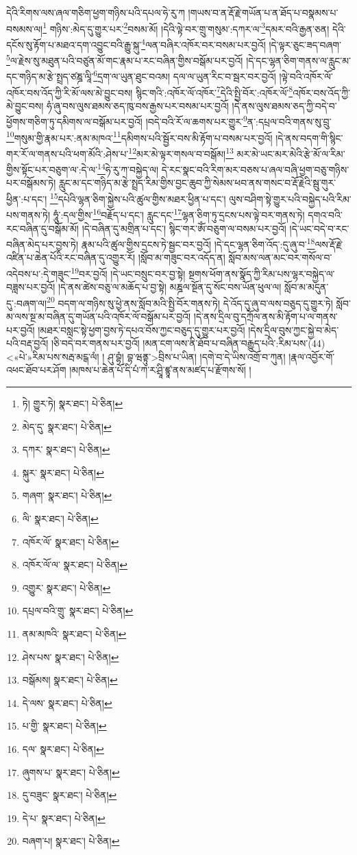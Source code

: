 དེའི་རིགས་ལས་ཞལ་གཅིག་ཕྱག་གཉིས་པའི་དཔལ་ཧེ་རུ་ཀ །གཡས་བ་ན་རྡོ་རྗེ་གཡོན་པ་ན་ཐོད་པ་བསྣམས་པ་བསམས་ལ།\footnote{ཏེ། གྱུར་ཏེ།  སྣར་ཐང་།  པེ་ཅིན། } གཉིས་:མེད་དུ་གྱུར་པར་\footnote{མེད་དུ་  སྣར་ཐང་།  པེ་ཅིན། }བསམ་མོ། །དེའི་ལྟེ་བར་གྲུ་གསུམ་:དཀར་ལ་\footnote{དཀར་  སྣར་ཐང་།  པེ་ཅིན། }དམར་བའི་རྒྱན་ཅན། དེའི་དངོས་སུ་རྟོག་པ་མཐའ་དག་འབྱུང་བའི་རྒྱུ་སྐུ་\footnote{སྐུར་  སྣར་ཐང་།  པེ་ཅིན། }ལན་བཞིར་འཁོར་བར་བསམ་པར་བྱའོ། །དེ་ལྟར་ཅུང་ཟད་བཞག་\footnote{གཞག་  སྣར་ཐང་།  པེ་ཅིན། }ལ་རྗེས་སུ་མཐུན་པའི་བཙུན་མོ་གང་རྣམ་པ་རང་བཞིན་གྱིས་བསྒོམ་པར་བྱའོ། །དེ་དང་ལྷན་ཅིག་གནས་ལ་རླུང་མ་དང་གཉིད་མ་རྩེ་སྤྲད་ཙཎྜ་ལཱི་\footnote{ལི་  སྣར་ཐང་།  པེ་ཅིན། }དྲག་ལ་ཡུན་ཐུང་བའམ། དལ་ལ་ཡུན་རིང་བ་སྦར་བར་བྱའོ། །ལྟེ་བའི་འཁོར་ལོ་འཁོར་བས་འོད་ཀྱི་རི་མོ་ལས་མེ་བྱུང་བས། སྙིང་གའི་:འཁོར་ལོ་འཁོར་\footnote{འཁོར་ལོ་  སྣར་ཐང་།  པེ་ཅིན། }དེའི་སྤྱི་བོར་:འཁོར་ལོ་\footnote{འཁོར་ལོ་ལ་  སྣར་ཐང་།  པེ་ཅིན། }འཁོར་བས་འོད་ཀྱི་མེ་བྱུང་བས། ཧཾ་ཞུ་བས་ལུས་ཐམས་ཅད་ཁུ་བས་རྒྱས་པར་བསམ་པར་བྱའོ། །དེ་ནས་ལུས་ཐམས་ཅད་ཀྱི་བདེ་བ་ཕྱོགས་གཅིག་ཏུ་དམིགས་ལ་བསྒོམ་པར་བྱའོ། །བདེ་བའི་རོ་ལ་ཆགས་པར་གྱུར་\footnote{འགྱུར་  སྣར་ཐང་།  པེ་ཅིན། }ན་:དཔྲལ་བའི་གནས་སུ་བྲུ་\footnote{དཔྲལ་བའི་གྲུ་  སྣར་ཐང་།  པེ་ཅིན། }གསུམ་གྱི་རྣམ་པར་:ནམ་མཁའ་\footnote{ནམ་མཁའི་  སྣར་ཐང་།  པེ་ཅིན། }དམིགས་པའི་སྦྱོར་བས་མི་རྟོག་པ་བསམ་པར་བྱའོ། །དེ་ནས་བདག་གི་སྙིང་གར་རོ་ལ་གནས་པའི་ཕག་མོའི་:ཤེས་པ་\footnote{ཤེས་པས་  སྣར་ཐང་།  པེ་ཅིན། }མར་མེ་ལྟར་གསལ་བ་བསྒོམ།\footnote{བསྒོམས།  སྣར་ཐང་།  པེ་ཅིན། } མར་མེ་ཡང་མར་མེའི་རྩེ་མོ་ལ་རིམ་གྱིས་སྟོང་པར་བཅུག་ལ་:དེ་ལ་\footnote{དེ་ལས་  སྣར་ཐང་།  པེ་ཅིན། }ཧེ་རུ་ཀ་བསྐྱེད་ལ། དེ་རང་སྣང་བའི་རིག་མར་བཅས་པ་ཞལ་བཞི་ཕྱག་བཅུ་གཉིས་པར་བསྒོམས་ཏེ། རླུང་མ་དང་གཉིད་མ་རྩེ་སྤྲད་རིམ་གྱིས་བྱང་ཆུབ་ཀྱི་སེམས་ཕབ་ནས་གསང་བ་རྡོ་རྗེའི་སྦུ་གུར་ཕྱིན་:པ་དང་། \footnote{པ་གྱི་  སྣར་ཐང་།  པེ་ཅིན། }དཔེའི་ལྷན་ཅིག་སྐྱེས་པའི་ཚུལ་གྱིས་མཐར་ཕྱིན་པ་དང་། ལུས་བཤིག་སྟེ་གྱུར་པའི་བསྐྱེད་པའི་རིམ་པས་གནས་ཏེ། ཧཱུཾ་:དལ་གྱིས་\footnote{དལ་  སྣར་ཐང་།  པེ་ཅིན། }བརྗོད་པ་དང་། རླུང་དང་\footnote{ཞུགས་པ་  སྣར་ཐང་།  པེ་ཅིན། }ལྷན་ཅིག་ཏུ་དྲངས་པས་ལྟེ་བར་གནས་ཏེ། དགའ་བའི་རང་བཞིན་དུ་བསྒོམ་མོ། །དེ་བཞིན་དུ་མགྲིན་པ་དང་། སྙིང་གར་ཨོཾ་བཅུག་ལ་བསམ་པར་བྱའོ། །དེ་ཡང་བདེ་བ་རང་བཞིན་མེད་པར་བྱས་ཏེ། རྣམ་པའི་ཚུལ་གྱིས་དྲངས་ཏེ་སྦྱང་བར་བྱའོ། །དེ་དང་ལྷན་ཅིག་འོད་:དུ་ཞུ་བ་\footnote{དུ་བཟུང་  སྣར་ཐང་།  པེ་ཅིན། }ལས་རྡོ་རྗེ་འཛིན་པ་ཆེན་པོའི་རང་བཞིན་དུ་འགྱུར་རོ། །སློབ་མ་གཟུང་བར་འདོད་ན། སློབ་མས་ལན་མང་བར་གསོལ་བ་འདེབས་པ་:དེ་གཟུང་\footnote{དེ་པ་  སྣར་ཐང་།  པེ་ཅིན། }བར་བྱའོ། །དེ་ཡང་བསྲུང་བར་བྱ་སྟེ། སྔགས་ཕོག་ནས་སྣོད་ཀྱི་རིམ་པས་ལྷར་བསྐྱེད་ལ་བཟླས་པར་བྱའོ། །དེ་ནས་ཚེས་བཅུ་ལ་མཆོད་པ་བྱ་སྟེ། མཎྜལ་སྔོན་དུ་སོང་བས་ཡོན་ཕུལ་ལ། སློབ་མ་མདུན་དུ་:བཞག་ལ།\footnote{བཞག་པ།  སྣར་ཐང་།  པེ་ཅིན། } བདག་ལ་གཉིས་སུ་ཕྱེ་ནས་སློབ་མའི་སྤྱི་བོར་གནས་ཏེ། དེ་འོད་དུ་ཞུ་བ་ལས་བཅུད་དུ་གྱུར་ཏེ། སློབ་མ་ལས་སྔ་མ་བཞིན་དུ་གཡོན་པའི་འཁོར་ལོ་བསྒོམ་པར་བྱའོ། །དེ་ནས་དྲིལ་བུ་དཀྲོལ་ནས་མི་རྟོག་པ་ལ་གནས་པར་བྱའོ། །མཐར་བསླང་སྟེ་ཕྱག་བྱས་ཏེ་དཔའ་བོས་ཀྱང་བཅུད་དུ་གྱུར་པར་བྱའོ། །དེས་དྲིལ་བུས་ཀྱང་སྐྱེ་བ་མེད་པའི་བརྡ་བྱའོ། །ཅི་བདེ་བར་གནས་པར་བྱའོ། །མན་ངག་ལས་ནི་ཐོབ་པ་བཞིན་བརྒྱུད་པའི་:རིམ་པས་(44) <«པེ་»རིམ་པས་སརྦ་མངྒ་ལཾ། །
ཤུ་བྷཾ། བྷ་ཝནྟུ་>བྲིས་པ་ཡིན། །དགེ་བ་དེ་ཡིས་འགྲོ་བ་ཀུན། །རྣལ་འབྱོར་གོ་འཕང་ཐོབ་པར་ཤོག །མཁས་པ་ཆེན་པོ་དི་པཾ་ཀ་ར་ཤྲཱི་ཛྙཱ་ནས་མཛད་པ་རྫོགས་སོ། །